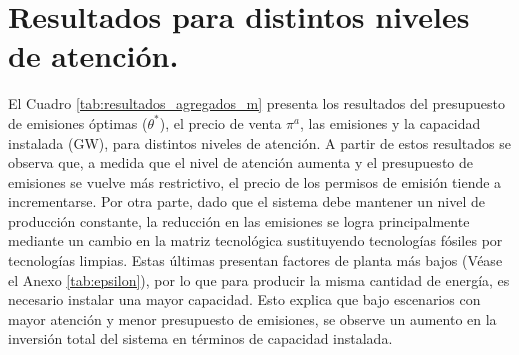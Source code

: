 \section{Resultados para distintos niveles de atención.}
El Cuadro \ref{tab:resultados_agregados_m} presenta los resultados del presupuesto de emisiones óptimas ($\theta^*$), el precio de venta $\pi^a$, las emisiones y la capacidad instalada (GW), para distintos niveles de atención. A partir de estos resultados se observa que, a medida que el nivel de atención aumenta y el presupuesto de emisiones se vuelve más restrictivo, el precio de los permisos de emisión tiende a incrementarse. Por otra parte, dado que el sistema debe mantener un nivel de producción constante, la reducción en las emisiones se logra principalmente mediante un cambio en la matriz tecnológica sustituyendo tecnologías fósiles por tecnologías limpias. Estas últimas presentan factores de planta más bajos (Véase el Anexo \ref{tab:epsilon}), por lo que para producir la misma cantidad de energía, es necesario instalar una mayor capacidad. Esto explica que bajo escenarios con mayor atención y menor presupuesto de emisiones, se observe un aumento en la inversión total del sistema en términos de capacidad instalada.

